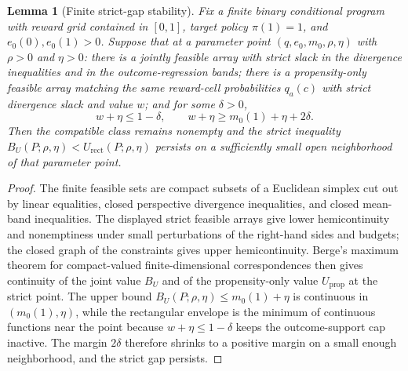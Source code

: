 \documentclass[11pt]{article}
\theoremstyle{definition}
\theoremstyle{plain}
\newtheorem{lemma}{Lemma}
\theoremstyle{remark}
\begin{document}
\begin{lemma}[Finite strict-gap stability]\label{lem:strict-gap-stability}
Fix a finite binary conditional program with reward grid contained in $[0,1]$,
target policy $\pi(1)=1$, and $e_0(0),e_0(1)>0$.  Suppose that at a parameter
point $(q,e_0,m_0,\rho,\eta)$ with $\rho>0$ and $\eta>0$: there is a jointly
feasible array with strict slack in the divergence inequalities and in the
outcome-regression bands; there is a propensity-only feasible array matching
the same reward-cell probabilities $q_a(c)$ with strict divergence slack and
value $w$; and for some
$\delta>0$,
\[
  w+\eta \le 1-\delta,\qquad
  w+\eta \ge m_0(1)+\eta+2\delta .
\]
Then the compatible class remains nonempty and the strict inequality
$B_U(P;\rho,\eta)<U_{\mathrm{rect}}(P;\rho,\eta)$ persists on a sufficiently
small open neighborhood of that parameter point.
\end{lemma}

\begin{proof}
The finite feasible sets are compact subsets of a Euclidean simplex cut out by
linear equalities, closed perspective divergence inequalities, and closed
mean-band inequalities.  The displayed strict feasible arrays give lower
hemicontinuity and nonemptiness under small perturbations of the right-hand
sides and budgets; the closed graph of the constraints gives upper
hemicontinuity.  Berge's maximum theorem for compact-valued finite-dimensional
correspondences then gives continuity of the joint value $B_U$ and of the
propensity-only value $U_{\mathrm{prop}}$ at the strict point.  The upper bound
$B_U(P;\rho,\eta)\le m_0(1)+\eta$ is continuous in $(m_0(1),\eta)$, while the
rectangular envelope is the minimum of continuous functions near the point
because $w+\eta\le1-\delta$ keeps the outcome-support cap inactive.  The margin
$2\delta$ therefore shrinks to a positive margin on a small enough
neighborhood, and the strict gap persists.
\end{proof}
\end{document}
